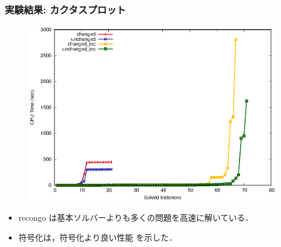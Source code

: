 \documentclass[dvipdfmx,11pt]{beamer}
\begin{document}
\begin{frame}\frametitle{実験結果: カクタスプロット}

  \begin{figure}[h]
    \centering
    \includegraphics[scale=0.7]{fig/cactus.eps}
  \end{figure}

  \begin{itemize}
    \item recongo は基本ソルバーよりも多くの問題を高速に解いている．
    \item {} 符号化は，符号化より良い性能
      を示した．
  \end{itemize}
  
\end{frame}
\end{document}
